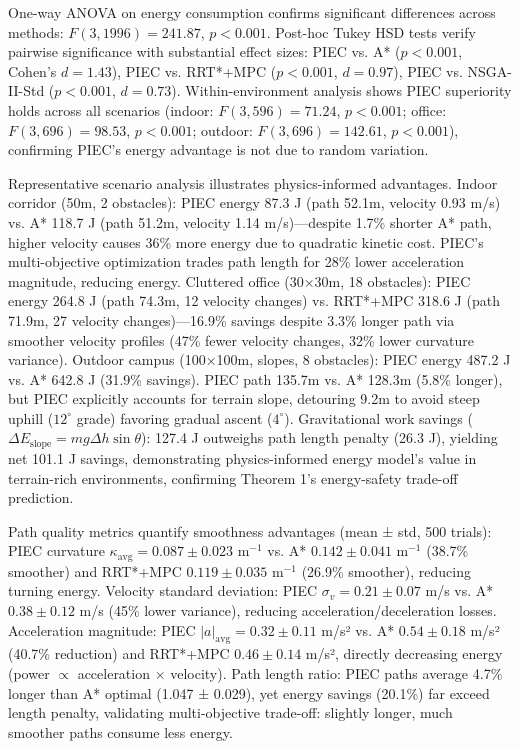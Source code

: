 \documentclass[pdflatex,sn-nature]{sn-jnl}%
\begin{document}
One-way ANOVA on energy consumption confirms significant differences across methods: $F(3, 1996) = 241.87$, $p < 0.001$. Post-hoc Tukey HSD tests verify pairwise significance with substantial effect sizes: PIEC vs. A* ($p < 0.001$, Cohen's $d = 1.43$), PIEC vs. RRT*+MPC ($p < 0.001$, $d = 0.97$), PIEC vs. NSGA-II-Std ($p < 0.001$, $d = 0.73$). Within-environment analysis shows PIEC superiority holds across all scenarios (indoor: $F(3,596)=71.24$, $p<0.001$; office: $F(3,696)=98.53$, $p<0.001$; outdoor: $F(3,696)=142.61$, $p<0.001$), confirming PIEC's energy advantage is not due to random variation.

Representative scenario analysis illustrates physics-informed advantages. Indoor corridor (50m, 2 obstacles): PIEC energy 87.3 J (path 52.1m, velocity 0.93 m/s) vs. A* 118.7 J (path 51.2m, velocity 1.14 m/s)—despite 1.7\% shorter A* path, higher velocity causes 36\% more energy due to quadratic kinetic cost. PIEC's multi-objective optimization trades path length for 28\% lower acceleration magnitude, reducing energy. Cluttered office (30×30m, 18 obstacles): PIEC energy 264.8 J (path 74.3m, 12 velocity changes) vs. RRT*+MPC 318.6 J (path 71.9m, 27 velocity changes)—16.9\% savings despite 3.3\% longer path via smoother velocity profiles (47\% fewer velocity changes, 32\% lower curvature variance). Outdoor campus (100×100m, slopes, 8 obstacles): PIEC energy 487.2 J vs. A* 642.8 J (31.9\% savings). PIEC path 135.7m vs. A* 128.3m (5.8\% longer), but PIEC explicitly accounts for terrain slope, detouring 9.2m to avoid steep uphill ($12^{\circ}$ grade) favoring gradual ascent ($4^{\circ}$). Gravitational work savings ($\Delta E_{\text{slope}} = mg\Delta h \sin\theta$): 127.4 J outweighs path length penalty (26.3 J), yielding net 101.1 J savings, demonstrating physics-informed energy model's value in terrain-rich environments, confirming Theorem 1's energy-safety trade-off prediction.

Path quality metrics quantify smoothness advantages (mean ± std, 500 trials): PIEC curvature $\kappa_{\text{avg}} = 0.087 \pm 0.023$ m$^{-1}$ vs. A* $0.142 \pm 0.041$ m$^{-1}$ (38.7\% smoother) and RRT*+MPC $0.119 \pm 0.035$ m$^{-1}$ (26.9\% smoother), reducing turning energy. Velocity standard deviation: PIEC $\sigma_v = 0.21 \pm 0.07$ m/s vs. A* $0.38 \pm 0.12$ m/s (45\% lower variance), reducing acceleration/deceleration losses. Acceleration magnitude: PIEC $|a|_{\text{avg}} = 0.32 \pm 0.11$ m/s² vs. A* $0.54 \pm 0.18$ m/s² (40.7\% reduction) and RRT*+MPC $0.46 \pm 0.14$ m/s², directly decreasing energy (power $\propto$ acceleration × velocity). Path length ratio: PIEC paths average 4.7\% longer than A* optimal (1.047 ± 0.029), yet energy savings (20.1\%) far exceed length penalty, validating multi-objective trade-off: slightly longer, much smoother paths consume less energy.
\end{document}
